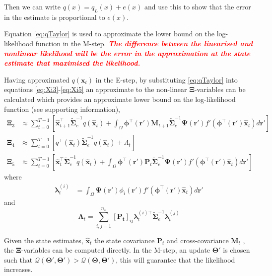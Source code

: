 \documentclass[]{article}
\newcommand{\dean}[1]{\textsf{\emph{\textbf{\textcolor{red}{#1}}}}}
\begin{document}
Then we can write $q(x) = q_L(x) + e(x)$ and use this to show that the error in the estimate is proportional to $e(x)$.

Equation \ref{eq:qTaylor} is used to approximate the lower bound on the log-likelihood function in the M-step. \dean{The difference between the linearised and nonlinear likelihood will be the error in the approximation at the state estimate that maximised the likelihood.}

Having approximated $q\left(\mathbf x_t\right)$ in the E-step, by substituting  \ref{eq:qTaylor} into equations \ref{eq:Xi3}-\ref{eq:Xi5} an approximate to the non-linear $\boldsymbol\Xi$-variables can be calculated which provides an approximate lower bound on the log-likelihood function (see supporting information), 
\begin{align}
\boldsymbol\Xi_{3}&\approx\sum_{t=0}^{T-1}\left[ \mathbf{\hat x}_{t+1}^\top\tilde{\boldsymbol\Sigma}_e^{-1}q(\mathbf{\hat x}_t)+\int_\Omega\boldsymbol \phi^\top(\mathbf r') \mathbf M_{t+1} \tilde{\boldsymbol\Sigma}_e^{-1} \boldsymbol{\Psi}(\mathbf{r}') f'(\boldsymbol \phi^\top(\mathbf r')\mathbf {\hat x}_t) d\mathbf{r}'\right] \\	
\boldsymbol\Xi_{4}&\approx\sum_{t=0}^{T-1}\left[q^\top(\mathbf{\hat x}_t)\tilde{\boldsymbol\Sigma}_e^{-1}q(\mathbf{\hat x}_t)+\Lambda_t\right] \\
 \boldsymbol\Xi_{5}&\approx\sum_{t=0}^{T-1}\left[ \mathbf{\hat x}_{t}^\top\tilde{\boldsymbol\Sigma}_e^{-1}q(\mathbf{\hat x}_t)+\int_\Omega\boldsymbol \phi^\top(\mathbf r') \mathbf P_t \tilde{\boldsymbol\Sigma}_e^{-1}  \boldsymbol{\Psi}(\mathbf{r}') f'(\boldsymbol \phi^\top(\mathbf r')\mathbf {\hat x}_t) d\mathbf{r}'\right] 
 \end{align}
where
\begin{align}\label{eq:lambdat} 
	{\boldsymbol \lambda}_t^{(i)}&=\int_{\Omega} \boldsymbol \Psi(\mathbf r')\phi_i(\mathbf r')f'(\boldsymbol\phi^\top(\mathbf r')\mathbf {\hat x}_t)d\mathbf r'
\end{align}
and
\begin{equation}
 \boldsymbol\Lambda_t=\sum_{i,j=1}^{n_x}[\mathbf{P_t}]_{ij}{\boldsymbol\lambda}_t^{(i)\top}\tilde{\boldsymbol\Sigma}_e^{-1}{\boldsymbol\lambda}_t^{(j)}
\end{equation}

Given the state estimates, $\mathbf {\hat x}_t$ the state covariance $\mathbf P_t$ and cross-covariance $\mathbf M_t$ , the $\boldsymbol\Xi$-variables can be computed directly. In the M-step, an update $\boldsymbol\Theta'$ is chosen such that $\mathcal{Q}\left(\boldsymbol\Theta',\boldsymbol\Theta'\right)>\mathcal{Q}\left(\boldsymbol\Theta,\boldsymbol\Theta'\right)$, this will guarantee that the likelihood increases. 
\end{document}
